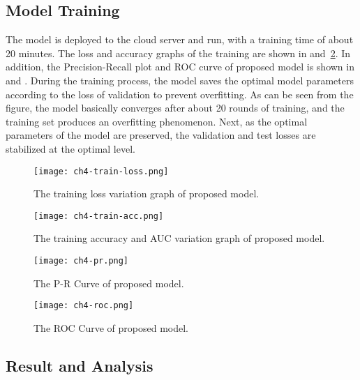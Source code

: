\subsection{Model Training}
%
The model is deployed to the cloud server and run, with a training time of about 20 minutes. The loss and accuracy graphs of the training are shown in \figname{\ref{fig:ch4-train-loss}} and~\ref{fig:ch4-train-acc}. In addition, the Precision-Recall plot and ROC curve of proposed model is shown in \figname{\ref{fig:ch4-pr-res}} and \figname{\ref{fig:ch4-roc-curve}}. During the training process, the model saves the optimal model parameters according to the loss of validation to prevent overfitting. As can be seen from the figure, the model basically converges after about 20 rounds of training, and the training set produces an overfitting phenomenon. Next, as the optimal parameters of the model are preserved, the validation and test losses are stabilized at the optimal level.

\begin{figure}[htbp!]
    \centering
    \texttt{[image: ch4-train-loss.png]}
    \caption{The training loss variation graph of proposed model.}\label{fig:ch4-train-loss}
\end{figure}

\begin{figure}[htbp!]
    \centering
    \texttt{[image: ch4-train-acc.png]}
    \caption{The training accuracy and AUC variation graph of proposed model.}\label{fig:ch4-train-acc}
\end{figure}

\begin{figure}[htbp!]
    \centering
    \texttt{[image: ch4-pr.png]}
    \caption{The P-R Curve of proposed model.}\label{fig:ch4-pr-res}
\end{figure}

\begin{figure}[htbp!]
    \centering
    \texttt{[image: ch4-roc.png]}
    \caption{The ROC Curve of proposed model.}\label{fig:ch4-roc-curve}
\end{figure}

\subsection{Result and Analysis}

